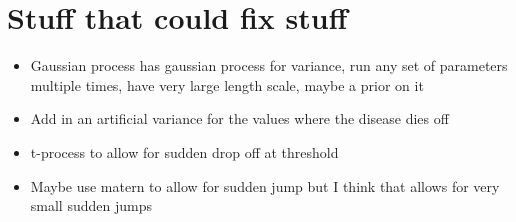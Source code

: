 \chapter{Stuff that could fix stuff}

\begin{itemize}
    \item Gaussian process has gaussian process for variance, run any set of parameters multiple times, have very large length scale, maybe a prior on it
    \item Add in an artificial variance for the values where the disease dies off
    \item t-process to allow for sudden drop off at threshold
    \item Maybe use matern to allow for sudden jump but I think that allows for very small sudden jumps
\end{itemize}